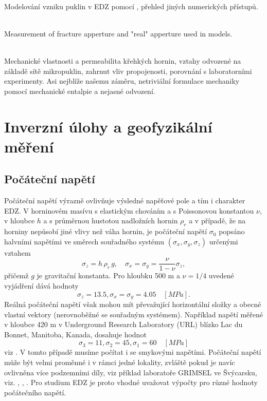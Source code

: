\documentclass{article}
\begin{document}
{\bf \cite{Lisjak2014}}\\
Modelování vzniku puklin v EDZ pomocí ,
přehled jiných numerických přístupů. 

{\bf  \cite{Barton1985}}\\
Measurement of fracture apperture and "real" apperture used in models.

{\bf \cite{Shao2005}}\\
Mechanické vlastnosti a permeabilita křehkých hornin, vztahy odvozené na základě sítě mikropuklin, zahrnut vliv propojenosti, porovnání s laboratorními experimenty. Asi nejblíže našemu záměru, netriviální formulace mechaniky pomocí mechanické entalpie a nejasné odvození.


\section{Inverzní úlohy a geofyzikální měření}
\subsection{Počáteční napětí}
\label{sec:sigma0}
Počáteční napětí výrazně ovlivňuje výsledné napěťové pole a tím i charakter EDZ.
V horninovém masívu s elastickým chováním a s Poissonovou konstantou $\nu$, v hloubce $h$ a s průměrnou hustotou nadložních hornin $\rho_{r}$ a v případě,
že na horniny nepůsobí jiné vlivy než váha hornin, je počáteční napětí $\sigma_0$
popsáno halvními napětími ve směrech souřadného systému $(\sigma_x, \sigma_y, \sigma_z)$ určenými vztahem
\begin{equation}
	\sigma_z = h\,\rho_{r}\, g, \quad \sigma_x = \sigma_y = \frac{\nu}{1-\nu} \sigma_z,
\end{equation}
přičemž $g$ je gravitační konstanta. Pro hloubku 500 m a $\nu = 1/4$ uvedené vyjádření dává hodnoty
$$
	\sigma_z = 13.5, \sigma_x = \sigma_y = 4.05\quad [MPa].
$$
Reálná počáteční napětí však mohou mít převažující horizontální složky a obecné vlastní vektory (nerovnoběžné se souřadným systémem). Například napětí měřené v hloubce 420 m v Underground Research Laboratory (URL) blízko Lac du Bonnet, Manitoba, Kanada, dosahuje hodnot
$$
	\sigma_3 = 11, \sigma_2 = 45, \sigma_1 = 60\quad [MPa]
$$
viz \cite{Rutqvist2009}. V tomto případě musíme počítat i se smykovými napětími. Počáteční napětí může být velmi proměnné i v rámci jedné lokality, zvláště pokud je navíc ovlivněna více podzemními díly, viz příklad laboratoře GRIMSEL ve Švýcarsku, viz. \cite{Krietsch2019},
\cite{Stas2016}, \cite{Rutqvist2004}. Pro studium EDZ je proto vhodné uvažovat výpočty pro různé hodnoty počátečního napětí.
\end{document}
